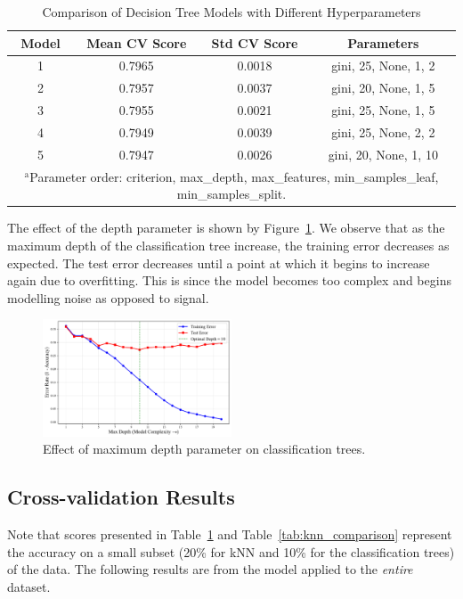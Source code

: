 \documentclass[10pt, conference]{IEEEtran}
\begin{document}
\begin{table}[htbp]
	\caption{Comparison of Decision Tree Models with Different Hyperparameters}
	\begin{center}
		\begin{tabular}{|c|c|c|c|}
			\hline
			\textbf{Model} & \textbf{Mean CV Score} & \textbf{Std CV Score} & \textbf{Parameters} \\
			\hline
			1 & 0.7965 & 0.0018 & gini, 25, None, 1, 2 \\ \hline
			2 & 0.7957 & 0.0037 & gini, 20, None, 1, 5 \\ \hline
			3 & 0.7955 & 0.0021 & gini, 25, None, 1, 5 \\ \hline
			4 & 0.7949 & 0.0039 & gini, 25, None, 2, 2 \\ \hline
			5 & 0.7947 & 0.0026 & gini, 20, None, 1, 10 \\ \hline
			\multicolumn{4}{p{0.95\linewidth}}{%
				$^{\mathrm{a}}$Parameter order: criterion, max\_depth, max\_features, min\_samples\_leaf, min\_samples\_split.%
			} 
		\end{tabular}
		\label{tab:dt_comparison}
	\end{center}
\end{table}

The effect of the depth parameter is shown by Figure~\ref{fig:dt-perf}. We observe that as the maximum depth of the classification tree increase, the training error decreases as expected. The test error decreases until a point at which it begins to increase again due to overfitting. This is since the model becomes too complex and begins modelling noise as opposed to signal.


\begin{figure}[htbp]
	\centering
	\includegraphics[width=0.5\textwidth]{../plots/dt_training_vs_test_error.pdf}
	\caption{Effect of maximum depth parameter on classification trees.}
	\label{fig:dt-perf}
\end{figure}

\subsection{Cross-validation Results}
Note that scores presented in Table~\ref{tab:dt_comparison} and Table~\ref{tab:knn_comparison} represent the accuracy on a small subset (20\% for kNN and 10\% for the classification trees) of the data. The following results are from the model applied to the \textit{entire} dataset. 
\end{document}
